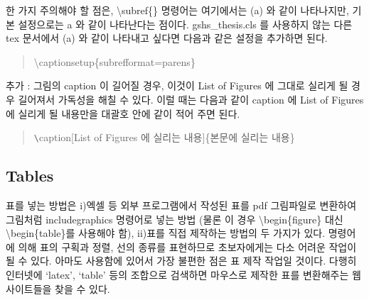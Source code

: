 \documentclass[twoside,11pt]{gshs_thesis}
\begin{document}
한 가지 주의해야 할 점은, \textbackslash subref\{\} 명령어는 여기에서는 (a) 와 같이 나타나지만, 기본 설정으로는 a 와 같이 나타난다는 점이다. gshs\_thesis.cls 를 사용하지 않는 다른 tex 문서에서 (a) 와 같이 나타내고 싶다면 다음과 같은 설정을 추가하면 된다.
\begin{quote}
	\textbackslash captionsetup\{subrefformat=parens\}
\end{quote}

추가 : 그림의 caption 이 길어질 경우, 이것이 List of Figures 에 그대로 실리게 될 경우 길어져서 가독성을 해칠 수 있다. 이럴 때는 다음과 같이 caption 에 List of Figures 에 실리게 될 내용만을 대괄호 안에 같이 적어 주면 된다. 
\begin{quote}
	\verb+\+caption[List of Figures 에 실리는 내용]\{본문에 실리는 내용\}
\end{quote}

\subsection{Tables}

 표를 넣는 방법은 i)엑셀 등 외부 프로그램에서 작성된 표를 pdf 그림파일로 변환하여 그림처럼 includegraphics 명령어로 넣는 방법 (물론 이 경우 {\textbackslash}begin\{figure\} 대신 {\textbackslash}begin\{table\}를 사용해야 함), ii) 표를 직접 제작하는 방법의 두 가지가 있다.  명령어에 의해 표의 구획과 정렬, 선의 종류를 표현하므로 초보자에게는 다소 어려운 작업이 될 수 있다. 아마도  사용함에 있어서 가장 불편한 점은 표 제작 작업일 것이다. 다행히 인터넷에 `latex', `table' 등의 조합으로 검색하면 마우스로 제작한 표를  변환해주는 웹사이트들을 찾을 수 있다.
\end{document}
